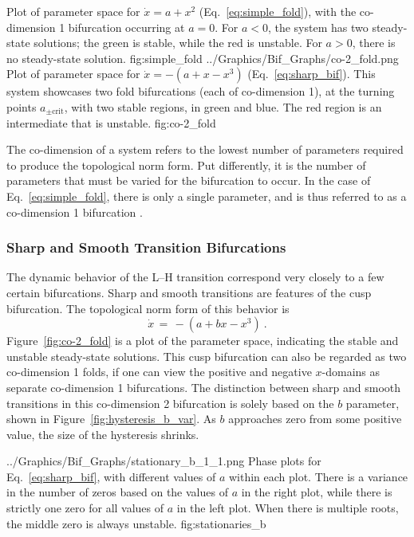 	{Plot of parameter space for $\dot{x} = a + x^2$ (Eq.~\ref{eq:simple_fold}), with the co-dimension 1 bifurcation occurring at $a = 0$. %
	For $a < 0$, the system has two steady-state solutions; the green is stable, while the red is unstable.
	For $a > 0$, there is no steady-state solution.}
	{fig:simple_fold}
	{../Graphics/Bif_Graphs/co-2_fold.png}
	{Plot of parameter space for $\dot{x} = -(a + x - x^3)$ (Eq.~\ref{eq:sharp_bif}). %
	This system showcases two fold bifurcations (each of co-dimension 1), at the turning points $a_{\pm\text{crit}}$, with two stable regions, in green and blue. %
	The red region is an intermediate that is unstable.}
	{fig:co-2_fold}

The co-dimension of a system refers to the lowest number of parameters required to produce the topological norm form.
Put differently, it is the number of parameters that must be varied for the bifurcation to occur.
In the case of Eq.~\ref{eq:simple_fold}, there is only a single parameter, and is thus referred to as a co-dimension 1 bifurcation \cite{weymiens_bifurcation_2014}.

\subsubsection{Sharp and Smooth Transition Bifurcations}

The dynamic behavior of the L--H transition correspond very closely to a few certain bifurcations.
Sharp and smooth transitions are features of the cusp bifurcation.
The topological norm form of this behavior is
\begin{equation}
	\dot{x} \,=\, -(a + bx - x^3)~.
	\label{eq:sharp_bif}
\end{equation}
Figure~\ref{fig:co-2_fold} is a plot of the parameter space, indicating the stable and unstable steady-state solutions.
This cusp bifurcation can also be regarded as two co-dimension 1 folds, if one can view the positive and negative $x$-domains as separate co-dimension 1 bifurcations.
The distinction between sharp and smooth transitions in this co-dimension 2 bifurcation is solely based on the $b$ parameter, shown in Figure~\ref{fig:hysteresis_b_var}.
As $b$ approaches zero from some positive value, the size of the hysteresis shrinks.

	{../Graphics/Bif_Graphs/stationary_b_1_1.png}
	{Phase plots for Eq.~\ref{eq:sharp_bif}, with different values of $a$ within each plot. %
	There is a variance in the number of zeros based on the values of $a$ in the right plot, while there is strictly one zero for all values of $a$ in the left plot. %
	When there is multiple roots, the middle zero is always unstable.}
	{fig:stationaries_b}


